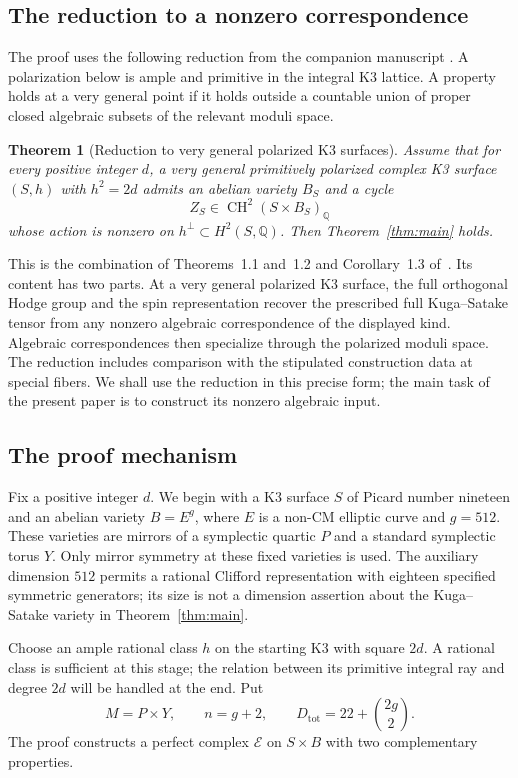 \documentclass[11pt]{article}
\numberwithin{equation}{section}
\newtheorem{theorem}{Theorem}[section]
\theoremstyle{definition}
\theoremstyle{remark}
\newcommand{\Q}{\mathbb Q}
\newcommand{\CH}{\operatorname{CH}}
\begin{document}
\subsection{The reduction to a nonzero correspondence}

The proof uses the following reduction from the companion manuscript
\cite{R}.  A polarization below is ample and primitive in the
integral K3 lattice.  A property holds at a very general point if it
holds outside a countable union of proper closed algebraic subsets
of the relevant moduli space.

\begin{theorem}[Reduction to very general polarized K3 surfaces]
\label{thm:reduction}
Assume that for every positive integer $d$, a very general
primitively polarized complex K3 surface $(S,h)$ with $h^2=2d$
admits an abelian variety $B_S$ and a cycle
\[
       Z_S\in\CH^2(S\times B_S)_\Q
\]
whose action is nonzero on $h^\perp\subset H^2(S,\Q)$.
Then Theorem~\ref{thm:main} holds.
\end{theorem}

This is the combination of Theorems~1.1 and~1.2 and
Corollary~1.3 of~\cite{R}.  Its content has two parts.  At a very
general polarized K3 surface, the full orthogonal Hodge group and
the spin representation recover the prescribed full Kuga--Satake
tensor from any nonzero algebraic correspondence of the displayed
kind.  Algebraic correspondences then specialize through the
polarized moduli space.  The reduction includes comparison with
the stipulated construction data at special fibers.  We shall use
the reduction in this precise form; the main task of the present
paper is to construct its nonzero algebraic input.

\subsection{The proof mechanism}

Fix a positive integer $d$.  We begin with a K3 surface $S$ of
Picard number nineteen and an abelian variety $B=E^g$, where $E$ is
a non-CM elliptic curve and $g=512$.  These varieties are mirrors
of a symplectic quartic $P$ and a standard symplectic torus $Y$.
Only mirror symmetry at these fixed varieties is used.  The
auxiliary dimension $512$ permits a rational Clifford
representation with eighteen specified symmetric generators; its
size is not a dimension assertion about the Kuga--Satake variety
in Theorem~\ref{thm:main}.

Choose an ample rational class $h$ on the starting K3 with square
$2d$.  A rational class is sufficient at this stage; the relation
between its primitive integral ray and degree $2d$ will be handled
at the end.  Put
\[
             M=P\times Y,\qquad n=g+2,\qquad
             D_{\mathrm{tot}}=22+\binom{2g}{2}.
\]
The proof constructs a perfect complex $\mathcal E$ on $S\times B$
with two complementary properties.
\end{document}
